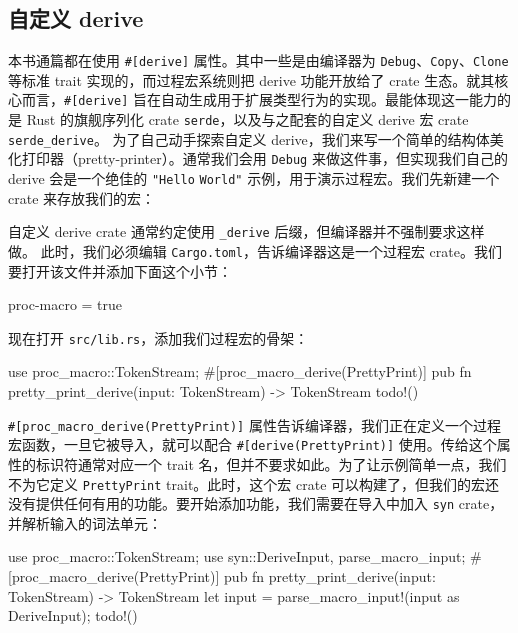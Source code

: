 \subsection{自定义 derive}
\label{idx:idx_4ffda6bd}
本书通篇都在使用 \texttt{\#[derive]} 属性。其中一些是由编译器为 \texttt{Debug}、\texttt{Copy}、\texttt{Clone} 等标准 trait 实现的，而过程宏系统则把 derive 功能开放给了 crate 生态。就其核心而言，\texttt{\#[derive]} 旨在自动生成用于扩展类型行为的实现。最能体现这一能力的是 Rust 的旗舰序列化 crate \texttt{serde}，以及与之配套的自定义 derive 宏 crate \texttt{serde\_\allowbreak{}derive}。
为了自己动手探索自定义 derive，我们来写一个简单的结构体美化打印器（pretty-\allowbreak{}printer）。通常我们会用 \texttt{Debug} 来做这件事，但实现我们自己的 derive 会是一个绝佳的 \texttt{"Hello}
\texttt{World"} 示例，用于演示过程宏。我们先新建一个 crate 来存放我们的宏：
自定义 derive crate 通常约定使用 \texttt{\_derive} 后缀，但编译器并不强制要求这样做。
此时，我们必须编辑 \texttt{Cargo.toml}，告诉编译器这是一个过程宏 crate。我们要打开该文件并添加下面这个小节：
\begin{codeboxdark}
[lib]
proc-macro = true
\end{codeboxdark}
\label{idx:idx_7dc4cd9c}
现在打开 \texttt{src/lib.rs}，添加我们过程宏的骨架：
\begin{codebox}[rust]
use proc_macro::TokenStream;
#[proc_macro_derive(PrettyPrint)]
pub fn pretty_print_derive(input: TokenStream) -> TokenStream {
  todo!()
}
\end{codebox}
\texttt{\#[\allowbreak{}proc\_\allowbreak{}macro\_\allowbreak{}derive(\allowbreak{}PrettyPrint)\allowbreak{}]\allowbreak{}} 属性告诉编译器，我们正在定义一个过程宏函数，一旦它被导入，就可以配合 \texttt{\#[\allowbreak{}derive(\allowbreak{}PrettyPrint)\allowbreak{}]\allowbreak{}} 使用。传给这个属性的标识符通常对应一个 trait 名，但并不要求如此。为了让示例简单一点，我们不为它定义 \texttt{PrettyPrint} trait。此时，这个宏 crate 可以构建了，但我们的宏还没有提供任何有用的功能。要开始添加功能，我们需要在导入中加入 \texttt{syn} crate，并解析输入的词法单元：
\begin{codebox}[rust]
use proc_macro::TokenStream;
use syn::{DeriveInput, parse_macro_input};
#[proc_macro_derive(PrettyPrint)]
pub fn pretty_print_derive(input: TokenStream) -> TokenStream {
  let input = parse_macro_input!(input as DeriveInput);
  todo!()
}
\end{codebox}
